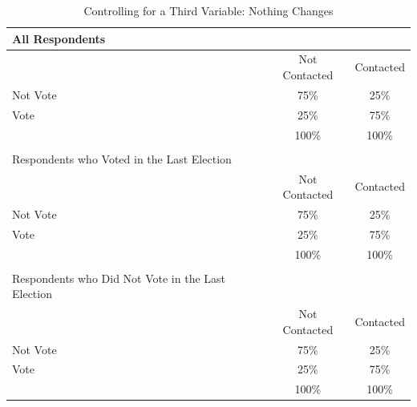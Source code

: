 \documentclass[11pt,openany]{book}\usepackage[]{graphicx}\usepackage[]{color}
\begin{document}
\begin{table}[h]
\centering
\caption{Controlling for a Third Variable: Nothing Changes} \label{tab:TableWithControl1}
\begin{tabular}{lcc}
All Respondents &  &  \\ \hline
\multicolumn{1}{|l|}{} & \multicolumn{1}{c|}{Not Contacted} & \multicolumn{1}{c|}{Contacted} \\ \hline
\multicolumn{1}{|l|}{Not Vote} & \multicolumn{1}{c|}{75\%} & \multicolumn{1}{c|}{25\%} \\ \hline
\multicolumn{1}{|l|}{Vote} & \multicolumn{1}{c|}{25\%} & \multicolumn{1}{c|}{75\%} \\ \hline
\multicolumn{1}{|l|}{} & \multicolumn{1}{c|}{100\%} & \multicolumn{1}{c|}{100\%} \\ \hline
&  &  \\ 
Respondents who Voted in the Last Election &  &  \\ \hline
\multicolumn{1}{|l|}{} & \multicolumn{1}{c|}{Not Contacted} & \multicolumn{1}{c|}{Contacted} \\ \hline
\multicolumn{1}{|l|}{Not Vote} & \multicolumn{1}{c|}{75\%} & \multicolumn{1}{c|}{25\%} \\ \hline
\multicolumn{1}{|l|}{Vote} & \multicolumn{1}{c|}{25\%} & \multicolumn{1}{c|}{75\%} \\ \hline
\multicolumn{1}{|l|}{} & \multicolumn{1}{c|}{100\%} & \multicolumn{1}{c|}{100\%} \\ \hline
 &  &  \\
Respondents who Did Not Vote in the Last Election &  &  \\ \hline
\multicolumn{1}{|l|}{} & \multicolumn{1}{c|}{Not Contacted} & \multicolumn{1}{c|}{Contacted} \\ \hline
\multicolumn{1}{|l|}{Not Vote} & \multicolumn{1}{c|}{75\%} & \multicolumn{1}{c|}{25\%} \\ \hline
\multicolumn{1}{|l|}{Vote} & \multicolumn{1}{c|}{25\%} & \multicolumn{1}{c|}{75\%} \\ \hline
\multicolumn{1}{|l|}{} & \multicolumn{1}{c|}{100\%} & \multicolumn{1}{c|}{100\%} \\ \hline
\end{tabular}
\end{table}
\end{document}

